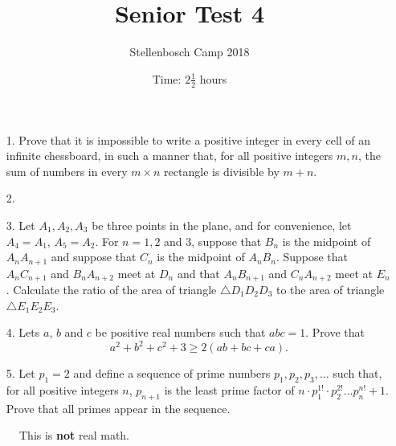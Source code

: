 \documentclass[a4paper, 12pt]{article}
\title{Senior Test 4}
\author{Stellenbosch Camp 2018}
\date{Time: $2 \frac{1}{2}$ hours}
\begin{document}
 \maketitle

\begin{enumerate}

\item[1.]  Prove that it is impossible to write a positive integer in every cell of an infinite chessboard, in such a manner that, for all positive integers $m, n$, the sum of numbers in every $m\times n$ rectangle is divisible by $m + n$.


\vspace{7pt}

% 
\item[2.] 


\vspace{5pt}

\item[3.]  
Let $A_1, A_2, A_3$ be three points in the plane, and for convenience, let $A_4 = A_1$, $A_5 = A_2$. For $n = 1, 2$ and $3$, suppose that $B_n$ is the midpoint of $A_n A_{n+1}$ and suppose that $C_n$ is the midpoint of $A_n B_n$. Suppose that $A_n C_{n+1}$ and $B_n A_{n+2}$ meet at $D_n$ and that $A_n B_{n+1}$ and $C_n A_{n+2}$ meet at $E_n$. Calculate the ratio of the area of triangle $\triangle D_1 D_2 D_3$ to the area of triangle $\triangle E_1 E_2 E_3$.


\vspace{7pt}

\item[4.]  Lets $a$, $b$ and $c$ be positive real numbers such that $abc=1$. Prove that \[ a^2 +b^2 +c^2 +3 \geq 2(ab+bc+ca). \]


\vspace{7pt}

\item[5.]   Let $p_1 = 2$ and define a sequence of prime numbers $p_1, p_2, p_3, \dots$ such that, for all positive integers $n$, $p_{n+1}$ is the least prime factor of $n \cdot p_1^{1!} \cdot p_2^{2!} \dots p_n^{n!} + 1$. Prove that all primes appear in the sequence.



\end{enumerate}

\vfill

\begin{figure}[h]
	\centering
{}
\caption{This is \textbf{not} real math.}
\end{figure}

\vspace{12mm}
\end{document}
